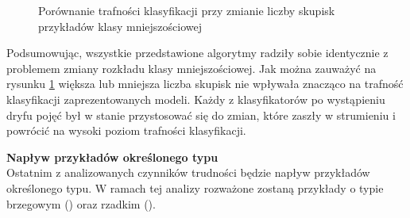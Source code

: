 \begin{figure}[h]
    \centering
    \qquad
    \qquad
    \caption{Porównanie trafności klasyfikacji przy zmianie liczby skupisk przykładów klasy mniejszościowej}\label{Figure:ChangeComposition}
\end{figure}

\noindent Podsumowując, wszystkie przedstawione algorytmy radziły sobie identycznie z problemem zmiany rozkładu klasy mniejszościowej. Jak można zauważyć na rysunku \ref{Figure:ChangeComposition} większa lub mniejsza liczba skupisk nie wpływała znacząco na trafność klasyfikacji zaprezentowanych modeli. Każdy z klasyfikatorów po wystąpieniu dryfu pojęć był w stanie przystosować się do zmian, które zaszły w strumieniu i powrócić na wysoki poziom trafności klasyfikacji.

\newpage

\noindent \textbf{Napływ przykładów określonego typu}\\

\noindent Ostatnim z analizowanych czynników trudności będzie napływ przykładów określonego typu. W ramach tej analizy rozważone zostaną przykłady o typie brzegowym () oraz rzadkim ().


